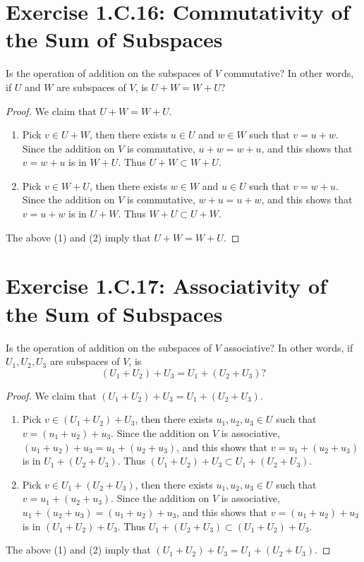 \section{Exercise 1.C.16: Commutativity of the Sum of Subspaces}
Is the operation of addition on the subspaces of $V$ commutative? In other words, if $U$ and $W$ are subspaces of $V$, is $U+W=W+U$?
\begin{proof}
We claim that $U+W=W+U$.
\begin{enumerate}
\item Pick $v\in U+W$, then there exists $u\in U$ and $w\in W$ such that $v=u+w$. Since the addition on $V$ is commutative, $u+w=w+u$, and this shows that $v=w+u$ is in $W+U$. Thus $U+W\subset W+U$.
\item Pick $v\in W+U$, then there exists $w\in W$ and $u\in U$ such that $v=w+u$. Since the addition on $V$ is commutative, $w+u=u+w$, and this shows that $v=u+w$ is in $U+W$. Thus $W+U\subset U+W$.
\end{enumerate}
The above (1) and (2) imply that $U+W=W+U$.
\end{proof}

\section{Exercise 1.C.17: Associativity of the Sum of Subspaces}
Is the operation of addition on the subspaces of $V$ associative? In other words, if $U_1, U_2, U_3$ are subspaces of $V$, is
\[
(U_1+U_2)+U_3=U_1+(U_2+U_3)?
\]
\begin{proof}
We claim that $(U_1+U_2)+U_3=U_1+(U_2+U_3)$.
\begin{enumerate}
\item Pick $v\in (U_1+U_2)+U_3$, then there exists $u_1,u_2,u_3\in U$ such that $v=(u_1+u_2)+u_3$. Since the addition on $V$ is associative, $(u_1+u_2)+u_3=u_1+(u_2+u_3)$, and this shows that $v=u_1+(u_2+u_3)$ is in $U_1+(U_2+U_3)$. Thus $(U_1+U_2)+U_3\subset U_1+(U_2+U_3)$.
\item Pick $v\in U_1+(U_2+U_3)$, then there exists $u_1,u_2,u_3\in U$ such that $v=u_1+(u_2+u_3)$. Since the addition on $V$ is associative, $u_1+(u_2+u_3)=(u_1+u_2)+u_3$, and this shows that $v=(u_1+u_2)+u_3$ is in $(U_1+U_2)+U_3$. Thus $U_1+(U_2+U_3)\subset (U_1+U_2)+U_3$.
\end{enumerate}
The above (1) and (2) imply that $(U_1+U_2)+U_3=U_1+(U_2+U_3)$.
\end{proof}


